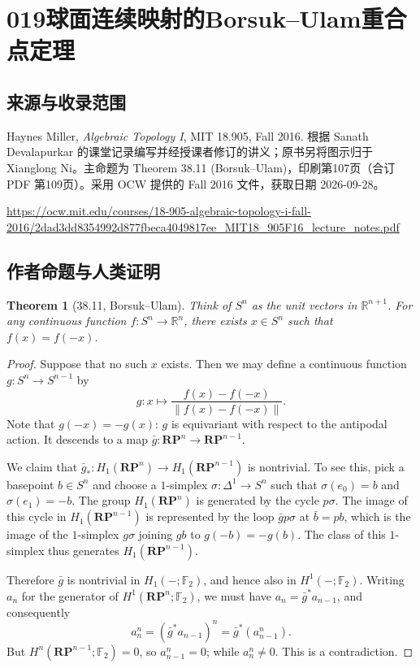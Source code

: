 \documentclass[UTF8,11pt]{ctexart}
\newtheorem*{theorem}{Theorem}
\theoremstyle{definition}
\newcommand{\R}{\mathbb R}
\begin{document}
\section*{019\quad 球面连续映射的Borsuk--Ulam重合点定理}
\subsection*{来源与收录范围}
Haynes Miller, \emph{Algebraic Topology I}, MIT 18.905, Fall 2016. 根据 Sanath Devalapurkar 的课堂记录编写并经授课者修订的讲义；原书另将图示归于 Xianglong Ni。主命题为 Theorem 38.11 (Borsuk--Ulam)，印刷第107页（合订 PDF 第109页）。采用 OCW 提供的 Fall 2016 文件，获取日期 2026-09-28。
\par\url{https://ocw.mit.edu/courses/18-905-algebraic-topology-i-fall-2016/2dad3dd8354992d877fbeca4049817ee_MIT18_905F16_lecture_notes.pdf}

\subsection*{作者命题与人类证明}

\begin{theorem}[38.11, Borsuk--Ulam]
Think of $S^n$ as the unit vectors in $\R^{n+1}$. For any continuous function $f:S^n\to\R^n$, there exists $x\in S^n$ such that $f(x)=f(-x)$.
\end{theorem}
\begin{proof}
Suppose that no such $x$ exists. Then we may define a continuous function $g:S^n\to S^{n-1}$ by
\[
g:x\longmapsto\frac{f(x)-f(-x)}{\|f(x)-f(-x)\|}.
\]
Note that $g(-x)=-g(x)$: $g$ is equivariant with respect to the antipodal action. It descends to a map $\bar g:\mathbf{RP}^n\to\mathbf{RP}^{n-1}$.

We claim that $\bar g_*:H_1(\mathbf{RP}^n)\to H_1(\mathbf{RP}^{n-1})$ is nontrivial. To see this, pick a basepoint $b\in S^n$ and choose a $1$-simplex $\sigma:\Delta^1\to S^n$ such that $\sigma(e_0)=b$ and $\sigma(e_1)=-b$. The group $H_1(\mathbf{RP}^n)$ is generated by the cycle $p\sigma$. The image of this cycle in $H_1(\mathbf{RP}^{n-1})$ is represented by the loop $\bar g p\sigma$ at $\bar b=pb$, which is the image of the $1$-simplex $g\sigma$ joining $gb$ to $g(-b)=-g(b)$. The class of this $1$-simplex thus generates $H_1(\mathbf{RP}^{n-1})$.

Therefore $\bar g$ is nontrivial in $H_1(-;\mathbb F_2)$, and hence also in $H^1(-;\mathbb F_2)$. Writing $a_n$ for the generator of $H^1(\mathbf{RP}^n;\mathbb F_2)$, we must have $a_n=\bar g^*a_{n-1}$, and consequently
\[
a_n^n=(\bar g^*a_{n-1})^n=\bar g^*(a_{n-1}^n).
\]
But $H^n(\mathbf{RP}^{n-1};\mathbb F_2)=0$, so $a_{n-1}^n=0$; while $a_n^n\neq0$. This is a contradiction.
\end{proof}
\end{document}
